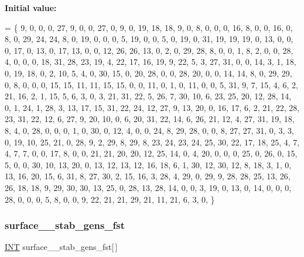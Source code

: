 {\bfseries Initial value\+:}
\begin{DoxyCode}
= \{
     9,  0,  0,  0, 27,  9,  0,  0, 27,  0,  9,  0, 19, 18, 18,  9, 0, 
     8,  0,  0,  0, 16,  8,  0,  0, 16,  0,  8,  0, 29, 24, 24,  8, 0, 
    19,  0,  0,  0,  5, 19,  0,  0,  5,  0, 19,  0, 31, 19, 19, 19, 0, 
    13,  0,  0,  0, 17,  0, 13,  0, 17, 13,  0,  0, 12, 26, 26, 13, 0, 
     2,  0, 29, 28,  8,  0,  0,  1,  8,  2,  0,  0, 28,  4,  0,  0, 0, 
    18, 31, 28, 23, 19,  4, 22, 17, 16, 19,  9, 22,  5,  3, 27, 31, 0, 
     0, 14,  3,  1, 18,  0, 19, 18,  0,  2, 10,  5,  4,  0, 30, 15, 0, 
    20, 28,  0,  0, 28, 20,  0,  0, 14, 14,  8,  0, 29, 29,  0,  8, 0, 
     0,  0, 15, 15, 11, 11, 15, 15,  0,  0, 11,  0,  1,  0, 11,  0, 0, 
     5, 31,  9,  7, 15,  4,  6,  2, 21, 16,  2,  1, 15,  5,  6,  3, 0, 
     3, 21, 31, 22,  5, 26,  7, 30, 10,  6, 23, 25, 20, 12, 28, 14, 0, 
     1, 24,  1, 28,  3, 13, 17, 15, 31, 22, 24, 12, 27,  9, 13, 20, 0, 
    16, 17,  6,  2, 21, 22, 28, 23, 31, 22, 12,  6, 27,  9, 20, 10, 0, 
     6, 20, 31, 22, 14,  6, 26, 21, 12,  4, 27, 31, 19, 18,  8,  4, 0, 
    28,  0,  0,  0,  1,  0, 30,  0, 12,  4,  0,  0, 24,  8, 29, 28, 0, 
     0,  8, 27, 27, 31,  0,  3,  3,  0, 19, 10, 25, 21,  0, 28,  9, 2, 
    29,  8, 29,  8, 23, 24, 23, 24, 25, 30, 22, 17, 18, 25,  4,  7, 4, 
     7,  7,  0,  0, 17,  8,  0,  0, 21, 21, 20, 20, 12, 25, 14,  0, 4, 
    20,  0,  0,  0, 25,  0, 26,  0, 15,  5,  0,  0, 30, 10, 13, 20, 0, 
    13, 12, 13, 12, 16, 18,  6,  1, 30, 12, 30, 12,  8, 18,  3,  1, 0, 
    13, 16, 20, 15,  6, 31,  8, 27, 30,  2, 15, 16,  3, 28,  4, 29, 0, 
    29,  9, 28, 28, 25, 13, 26, 26, 18, 18,  9, 29, 30, 30, 13, 25, 0, 
    28, 13, 28, 14,  0,  0,  3, 19,  0, 13,  0, 14,  0,  0,  0, 28, 0, 
     0,  0,  5,  8,  0,  0,  9, 22, 21, 21, 29, 21, 11, 21,  6,  3, 0, 
\}
\end{DoxyCode}
\mbox{\label{surface__32_8_c_a6cd1d992af80bb8010827dceea0bc84f}} 
\subsubsection{\texorpdfstring{surface\+\_\+\_\+stab\+\_\+gens\+\_\+fst}{surface\_32\_stab\_gens\_fst}}
{\footnotesize\ttfamily \mbox{\hyperlink{galois_8h_a09fddde158a3a20bd2dcadb609de11dc}{I\+NT}} surface\+\_\+\_\+stab\+\_\+gens\+\_\+fst\mbox{[}$\,$\mbox{]}}

